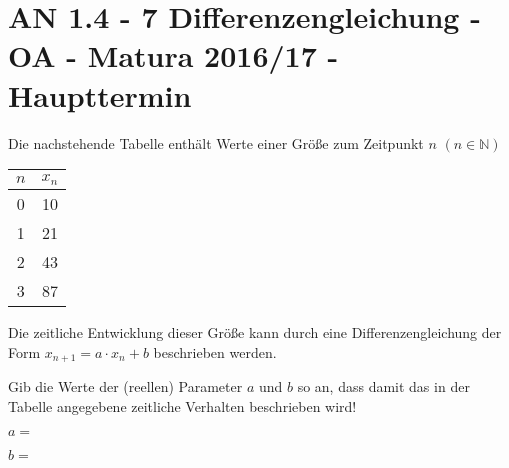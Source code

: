 \section{AN 1.4 - 7 Differenzengleichung - OA - Matura 2016/17 - Haupttermin}

\begin{beispiel}[AN 1.4]{1} %
Die nachstehende Tabelle enthält Werte einer Größe zum Zeitpunkt $n$ $(n \in \mathbb{N})$

\begin{center}
\begin{tabular}{|c|c|}\hline
\cellcolor{black!20} $n$ & \cellcolor{black!20} $x_n$ \\ \hline
0 & 10 \\ \hline
1 & 21 \\ \hline
2 & 43 \\ \hline
3 & 87 \\ \hline
\end{tabular}
\end{center}

Die zeitliche Entwicklung dieser Größe kann durch eine Differenzengleichung der Form
$x_{n+1} = a \cdot x_n + b$ beschrieben werden. \leer

Gib die Werte der (reellen) Parameter $a$ und $b$ so an, dass damit das in der Tabelle angegebene zeitliche Verhalten beschrieben wird! \leer

$a=$ 

$b=$  


\end{beispiel}